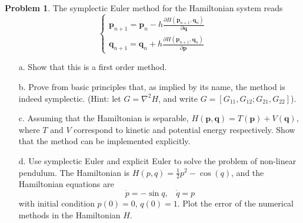 \documentclass[a4paper, 10pt]{article}
\theoremstyle{definition}
\newtheorem{problem}{Problem}
\theoremstyle{hSol}
\begin{document}
\begin{problem} The symplectic Euler method for the Hamiltonian system reads
\begin{equation}
\begin{cases}
  \bm{p}_{n+1} = \bm{p}_n - h \frac{\partial H(\bm{p}_{n+1}, \bm{q}_n)}{\partial \bm{q}} \\
  \bm{q}_{n+1} = \bm{q}_n + h \frac{\partial H(\bm{p}_{n+1}, \bm{q}_n)}{\partial \bm{p}}
\end{cases}
\end{equation}
\begin{itemize}
  \item[a.] Show that this is a first order method.
  \item[b.] Prove from basic principles that, as implied by its name, the method is indeed symplectic. (Hint: let $G=\nabla^2 H$, and write $G=[G_{11}, G_{12}; G_{21}, G_{22}]$).
  \item[c.] Assuming that the Hamiltonian is separable, $H(\bm{p}, \bm{q})=T(\bm{p})+V(\bm{q})$, where $T$ and $V$ correspond to kinetic and potential energy respectively. Show that the method can be implemented explicitly.
  \item[d.] Use symplectic Euler and explicit Euler to solve the problem of non-linear pendulum. The Hamiltonian is $H(p,q)=\frac{1}{2}p^2 - \cos({q})$, and the Hamiltonian equations are
  $$
  \dot{p} = -\sin q,~~~~\dot{q} = p
  $$
  with initial condition $p(0)=0$, $q(0)=1$. Plot the error of the numerical methods in the Hamiltonian $H$.
\end{itemize}
\end{problem}
\end{document}
